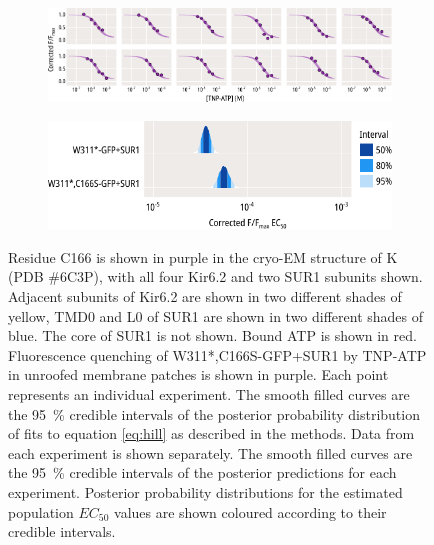 \begin{figure}[h]
\begin{subfigure}[t]{0.45\textwidth}
	\end{subfigure}
	\vfill
	\begin{subfigure}[t]{0.9\textwidth}
		\caption{}\label{ch5fig:c166s_indfits}
		\centering
		\includegraphics[width=\textwidth]{c166s_3.pdf}
	\end{subfigure}
	\vfill
	\begin{subfigure}[t]{0.7\textwidth}
		\caption{}\label{ch5fig:c166s_params}
		\centering
		\includegraphics[width=\textwidth]{c166s_4.pdf}
	\end{subfigure}
	\caption[C166S does not alter nucleotide binding]{
	 Residue C166 is shown in purple in the cryo-EM structure of K\ATP{} (PDB \#6C3P), with all four Kir6.2 and two SUR1 subunits shown.
	Adjacent subunits of Kir6.2 are shown in two different shades of yellow, TMD0 and L0 of SUR1 are shown in two different shades of blue.
	The core of SUR1 is not shown.
	Bound ATP is shown in red.
	 Fluorescence quenching of W311*,C166S-GFP+SUR1 by TNP-ATP in unroofed membrane patches is shown in purple.
	Each point represents an individual experiment.
	The smooth filled curves are the \SI{95}{\percent} credible intervals of the posterior probability distribution of fits to equation \ref{eq:hill} as described in the methods.
	 Data from each experiment is shown separately.
	The smooth filled curves are the \SI{95}{\percent} credible intervals of the posterior predictions for each experiment.
	 Posterior probability distributions for the estimated population $EC_{50}$ values are shown coloured according to their credible intervals.
	}\label{ch5fig:c166s_1}
\end{figure}

